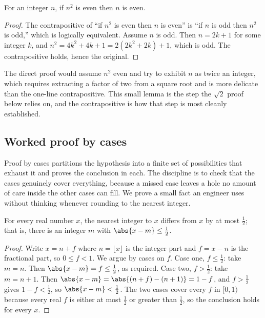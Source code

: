 \begin{theorem}
For an integer $n$, if $n^{2}$ is even then $n$ is even.
\end{theorem}

\begin{proof}
The contrapositive of ``if $n^{2}$ is even then $n$ is even'' is ``if
$n$ is odd then $n^{2}$ is odd,'' which is logically equivalent. Assume
$n$ is odd. Then $n = 2k + 1$ for some integer $k$, and $n^{2} = 4k^{2}
+ 4k + 1 = 2(2k^{2} + 2k) + 1$, which is odd. The contrapositive holds,
hence the original.
\end{proof}

The direct proof would assume $n^{2}$ even and try to exhibit $n$ as
twice an integer, which requires extracting a factor of two from a
square root and is more delicate than the one-line contrapositive.
This small lemma is the step the $\sqrt{2}$ proof below relies on, and
the contrapositive is how that step is most cleanly established.

\subsection{Worked proof by cases}

Proof by cases partitions the hypothesis into a finite set of
possibilities that exhaust it and proves the conclusion in each. The
discipline is to check that the cases genuinely cover everything, because
a missed case leaves a hole no amount of care inside the other cases can
fill. We prove a small fact an engineer uses without thinking whenever
rounding to the nearest integer.

\begin{theorem}
For every real number $x$, the nearest integer to $x$ differs from $x$
by at most $\tfrac12$; that is, there is an integer $m$ with $\abs{x - m}
\leq \tfrac12$.
\end{theorem}

\begin{proof}
Write $x = n + f$ where $n = \lfloor x \rfloor$ is the integer part and
$f = x - n$ is the fractional part, so $0 \leq f < 1$. We argue by cases
on $f$. Case one, $f \leq \tfrac12$: take $m = n$. Then $\abs{x - m} = f
\leq \tfrac12$, as required. Case two, $f > \tfrac12$: take $m = n + 1$.
Then $\abs{x - m} = \abs{(n + f) - (n + 1)} = 1 - f$, and $f > \tfrac12$
gives $1 - f < \tfrac12$, so $\abs{x - m} < \tfrac12$. The two cases
cover every $f$ in $[0, 1)$ because every real $f$ is either at most
$\tfrac12$ or greater than $\tfrac12$, so the conclusion holds for every
$x$.
\end{proof}

